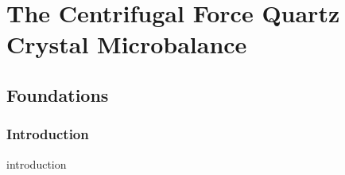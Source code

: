 \documentclass[a4paper,titlepage,onecolumn]{report}
\begin{document}

\part{The Centrifugal Force Quartz Crystal Microbalance}
\chapter{Foundations} \label{ch:qcmfoundations}
	\section{Introduction}
	{introduction}
\end{document}

